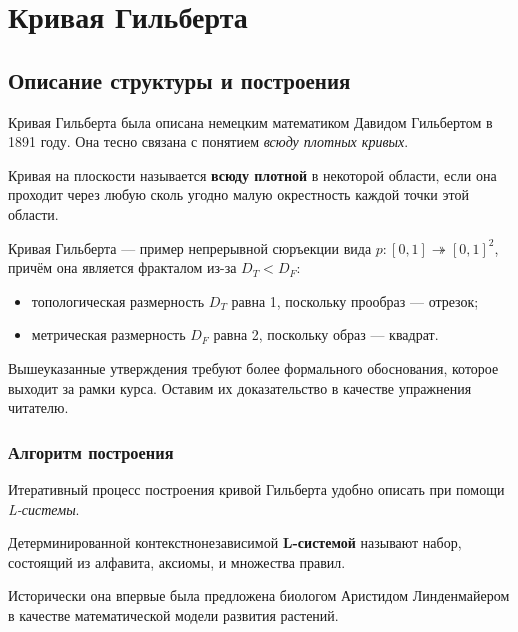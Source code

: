\section{Кривая Гильберта}

\subsection{Описание структуры и построения}

Кривая Гильберта была описана немецким математиком Давидом Гильбертом в 1891 году. Она тесно связана с понятием \textit{всюду плотных кривых}.

\begin{definition}
Кривая на плоскости называется \textbf{всюду плотной} в некоторой области, если она проходит через любую сколь угодно малую окрестность каждой точки этой области.
\end{definition}

Кривая Гильберта --- пример непрерывной сюръекции вида \( p\colon [0,1]\twoheadrightarrow [0,1]^2 \), причём она является фракталом из-за \( D_T<D_F \):

\begin{itemize}[itemsep=0pt, parsep=0pt]
  \item топологическая размерность \(D_T\) равна 1, поскольку прообраз — отрезок;
  \item метрическая размерность \(D_F\) равна 2, поскольку образ — квадрат.
\end{itemize}

Вышеуказанные утверждения требуют более формального обоснования, которое выходит за рамки курса. Оставим их доказательство в качестве упражнения читателю.

\subsubsection{Алгоритм построения}

Итеративный процесс построения кривой Гильберта удобно описать при помощи \textit{L-системы}.

\begin{definition}
  Детерминированной контекстнонезависимой \textbf{L-системой} называют набор, состоящий из алфавита, аксиомы, и множества правил.
\end{definition}

Исторически она впервые была предложена биологом Аристидом Линденмайером в качестве математической модели развития растений.

